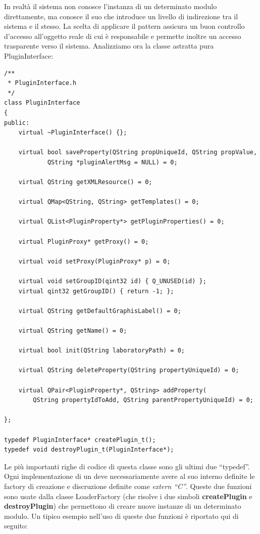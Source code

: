 In realtà il sistema non conosce l'instanza di un determinato modulo direttamente, ma conosce il suo \proxy{} che introduce un livello di indirezione tra il sistema e il \plugin{} stesso. La scelta di applicare il pattern \proxy{} assicura un buon controllo d'accesso all'oggetto reale di cui è responsabile e permette inoltre un accesso trasparente verso il sistema. Analizziamo ora la classe astratta pura PluginInterface:
\begin{lstlisting}
/**
 * PluginInterface.h
 */
class PluginInterface
{
public:
	virtual ~PluginInterface() {};

	virtual bool saveProperty(QString propUniqueId, QString propValue,
			QString *pluginAlertMsg = NULL) = 0;

	virtual QString getXMLResource() = 0;

	virtual QMap<QString, QString> getTemplates() = 0;
	
	virtual QList<PluginProperty*> getPluginProperties() = 0;

	virtual PluginProxy* getProxy() = 0;

	virtual void setProxy(PluginProxy* p) = 0;

	virtual void setGroupID(qint32 id) { Q_UNUSED(id) };
	virtual qint32 getGroupID() { return -1; };

	virtual QString getDefaultGraphisLabel() = 0;

	virtual QString getName() = 0;

	virtual bool init(QString laboratoryPath) = 0;
	
	virtual QString deleteProperty(QString propertyUniqueId) = 0;
	
	virtual QPair<PluginProperty*, QString> addProperty(
		QString propertyIdToAdd, QString parentPropertyUniqueId) = 0;
	
};

typedef PluginInterface* createPlugin_t();
typedef void destroyPlugin_t(PluginInterface*);
\end{lstlisting}

Le più importanti righe di codice di questa classe sono gli ultimi due ``typedef''. Ogni implementazione di un \plugin{} deve necessariamente avere al suo interno definite le factory di creazione e discruzione definite come \emph{extern ``C''}. Queste due funzioni sono usate dalla classe LoaderFactory (che risolve i due simboli \textbf{createPlugin} e \textbf{destroyPlugin}) che permettono di creare nuove instanze di un determinato modulo. Un tipico esempio nell'uso di queste due funzioni è riportato qui di seguito:

